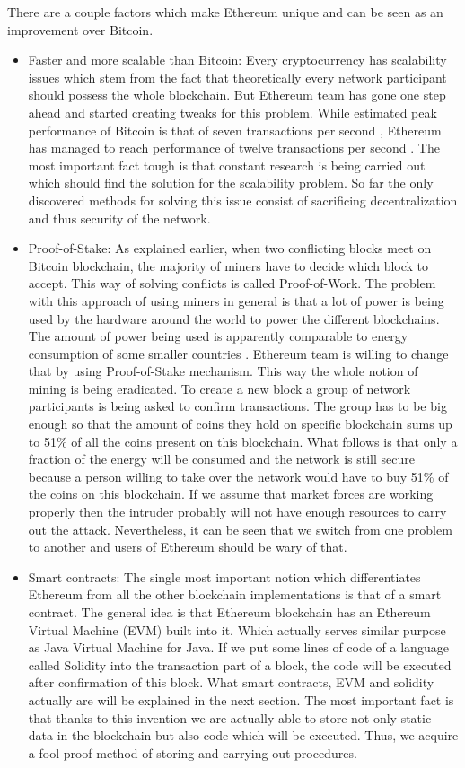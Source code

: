 \documentclass[a4paper,12pt,twoside,openany]{report}
\begin{document}
There are a couple factors which make Ethereum unique and can be seen as an improvement over Bitcoin. 
\begin{itemize}
\item Faster and more scalable than Bitcoin: Every cryptocurrency has scalability issues which stem from the fact that theoretically every network participant should possess the whole blockchain. But Ethereum team has gone one step ahead and started creating tweaks for this problem. While estimated peak performance of Bitcoin is that of seven transactions per second  \cite{bitcoin_trans}, Ethereum has managed to reach performance of twelve transactions per second \cite{eth_trans}. The most important fact tough is that constant research is being carried out which should find the solution for the scalability problem. So far the only discovered methods for solving this issue consist of sacrificing decentralization and thus security of the network.

\item Proof-of-Stake: As explained earlier, when two conflicting blocks meet on Bitcoin blockchain, the majority of miners have to decide which block to accept. This way of solving conflicts is called Proof-of-Work. The problem with this approach of using miners in general is that a lot of power is being used by the hardware around the world to power the different blockchains. The amount of power being used is apparently comparable to energy consumption of some smaller countries \cite{energy}.  Ethereum team is willing to change that by using Proof-of-Stake mechanism. This way the whole notion of mining is being eradicated. To create a new block a group of network participants is being asked to confirm transactions. The group has to be big enough so that the amount of coins they hold on specific blockchain sums up to 51\% of all the coins present on this blockchain. What follows is that only a fraction of the energy will be consumed and the network is still secure because a person willing to take over the network would have to buy 51\% of the coins on this blockchain. If we assume that market forces are working properly then the intruder probably will not have enough resources to carry out the attack. Nevertheless, it can be seen that we switch from one problem to another and users of Ethereum should be wary of that. 

\item Smart contracts: The single most important notion which differentiates Ethereum from all the other blockchain implementations is that of a smart contract. The general idea is that Ethereum blockchain has an Ethereum Virtual Machine (EVM) built into it. Which actually serves similar purpose as Java Virtual Machine for Java. If we put some lines of code of a language called Solidity into the transaction part of a block, the code will be executed after confirmation of this block. What smart contracts, EVM and solidity actually are will be explained in the next section. The most important fact is that thanks to this invention we are actually able to store not only static data in the blockchain but also code which will be executed. Thus, we acquire a fool-proof method of storing and carrying out procedures.
\end{itemize}
\end{document}
